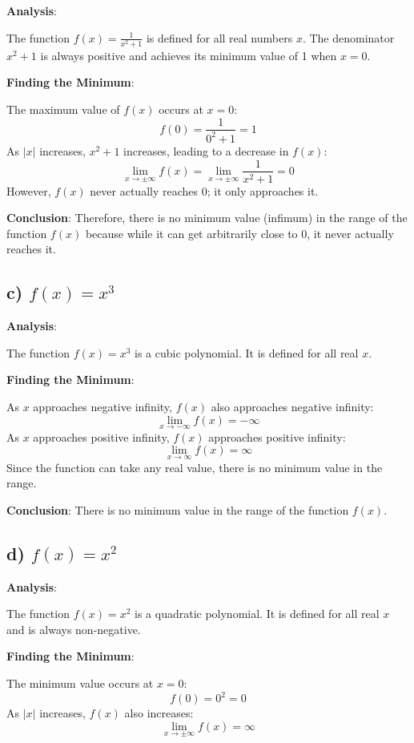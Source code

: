 \documentclass[12pt]{article}
\begin{document}
\textbf{Analysis}:

The function \( f(x) = \frac{1}{x^2 + 1} \) is defined for all real numbers \( x \). The denominator \( x^2 + 1 \) is always positive and achieves its minimum value of 1 when \( x = 0 \).

\textbf{Finding the Minimum}:

The maximum value of \( f(x) \) occurs at \( x = 0 \):
\[
f(0) = \frac{1}{0^2 + 1} = 1
\]
As \( |x| \) increases, \( x^2 + 1 \) increases, leading to a decrease in \( f(x) \):
\[
\lim_{x \to \pm\infty} f(x) = \lim_{x \to \pm\infty} \frac{1}{x^2 + 1} = 0
\]
However, \( f(x) \) never actually reaches 0; it only approaches it.

\textbf{Conclusion}: Therefore, there is no minimum value (infimum) in the range of the function \( f(x) \) because while it can get arbitrarily close to 0, it never actually reaches it.

\subsection*{c) \( f(x) = x^3 \)}

\textbf{Analysis}:

The function \( f(x) = x^3 \) is a cubic polynomial. It is defined for all real \( x \).

\textbf{Finding the Minimum}:

As \( x \) approaches negative infinity, \( f(x) \) also approaches negative infinity:
\[
\lim_{x \to -\infty} f(x) = -\infty
\]
As \( x \) approaches positive infinity, \( f(x) \) approaches positive infinity:
\[
\lim_{x \to \infty} f(x) = \infty
\]
Since the function can take any real value, there is no minimum value in the range.

\textbf{Conclusion}: There is no minimum value in the range of the function \( f(x) \).

\subsection*{d) \( f(x) = x^2 \)}

\textbf{Analysis}:

The function \( f(x) = x^2 \) is a quadratic polynomial. It is defined for all real \( x \) and is always non-negative.

\textbf{Finding the Minimum}:

The minimum value occurs at \( x = 0 \):
\[
f(0) = 0^2 = 0
\]
As \( |x| \) increases, \( f(x) \) also increases:
\[
\lim_{x \to \pm\infty} f(x) = \infty
\]
\end{document}
